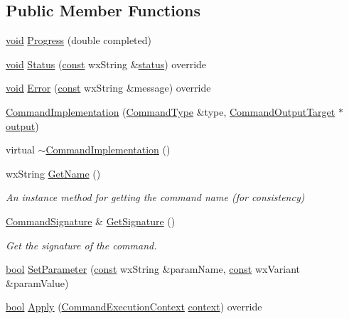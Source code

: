 \subsection*{Public Member Functions}
\begin{DoxyCompactItemize}
\item 
\hyperlink{sound_8c_ae35f5844602719cf66324f4de2a658b3}{void} \hyperlink{class_command_implementation_a4242c73b48151d9a27bad03422a63801}{Progress} (double completed)
\item 
\hyperlink{sound_8c_ae35f5844602719cf66324f4de2a658b3}{void} \hyperlink{class_command_implementation_a30a031d0366f5a62cc0d6772030409a3}{Status} (\hyperlink{getopt1_8c_a2c212835823e3c54a8ab6d95c652660e}{const} wx\+String \&\hyperlink{rfft2d_test_m_l_8m_a1b5437a866e6f95107b07ba845bc1800}{status}) override
\item 
\hyperlink{sound_8c_ae35f5844602719cf66324f4de2a658b3}{void} \hyperlink{class_command_implementation_a2999e7b85037e88b51cc10e68034969c}{Error} (\hyperlink{getopt1_8c_a2c212835823e3c54a8ab6d95c652660e}{const} wx\+String \&message) override
\item 
\hyperlink{class_command_implementation_a852479bec7ba5bd37f82d3d6ea3fbfcc}{Command\+Implementation} (\hyperlink{class_command_type}{Command\+Type} \&type, \hyperlink{class_command_output_target}{Command\+Output\+Target} $\ast$\hyperlink{mm_8c_aeb3fcf4ab0f02cc4420e5a97568a07ef}{output})
\item 
virtual \hyperlink{class_command_implementation_a6ff55e94984672dc23be64bc35d31285}{$\sim$\+Command\+Implementation} ()
\item 
wx\+String \hyperlink{class_command_implementation_afd7a6694c9a40741fb4a2fd0004ffe60}{Get\+Name} ()
\begin{DoxyCompactList}\small\item\em An instance method for getting the command name (for consistency) \end{DoxyCompactList}\item 
\hyperlink{class_command_signature}{Command\+Signature} \& \hyperlink{class_command_implementation_ab2139cf8e4a06ee9f487fcecd8c00dd3}{Get\+Signature} ()
\begin{DoxyCompactList}\small\item\em Get the signature of the command. \end{DoxyCompactList}\item 
\hyperlink{mac_2config_2i386_2lib-src_2libsoxr_2soxr-config_8h_abb452686968e48b67397da5f97445f5b}{bool} \hyperlink{class_command_implementation_a0da1ae118804136a883dc402b56943f3}{Set\+Parameter} (\hyperlink{getopt1_8c_a2c212835823e3c54a8ab6d95c652660e}{const} wx\+String \&param\+Name, \hyperlink{getopt1_8c_a2c212835823e3c54a8ab6d95c652660e}{const} wx\+Variant \&param\+Value)
\item 
\hyperlink{mac_2config_2i386_2lib-src_2libsoxr_2soxr-config_8h_abb452686968e48b67397da5f97445f5b}{bool} \hyperlink{class_command_implementation_a7b8787ad3b911316df9f097049a9eac3}{Apply} (\hyperlink{class_command_execution_context}{Command\+Execution\+Context} \hyperlink{structcontext}{context}) override
\end{DoxyCompactItemize}
